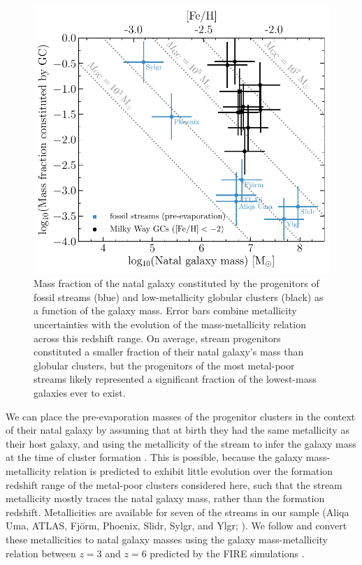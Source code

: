 \documentclass[twocolumn]{aastex63}
\begin{document}
\begin{figure}
\includegraphics[width=\hsize]{figures/mhost_fraction.pdf}
\caption{
\label{fig:mhost}
Mass fraction of the natal galaxy constituted by the progenitors of fossil streams (blue) and low-metallicity globular clusters (black) as a function of the galaxy mass.
Error bars combine metallicity uncertainties with the evolution of the mass-metallicity relation across this redshift range.
On average, stream progenitors constituted a smaller fraction of their natal galaxy's mass than globular clusters, but the progenitors of the most metal-poor streams likely represented a significant fraction of the lowest-mass galaxies ever to exist.
}
\end{figure}

We can place the pre-evaporation masses of the progenitor clusters in the context of their natal galaxy by assuming that at birth they had the same metallicity as their host galaxy, and using the metallicity of the stream to infer the galaxy mass at the time of cluster formation \citep{kruijssen20b}. This is possible, because the galaxy mass-metallicity relation is predicted to exhibit little evolution over the formation redshift range of the metal-poor clusters considered here, such that the stream metallicity mostly traces the natal galaxy mass, rather than the formation redshift. Metallicities are available for seven of the streams in our sample (Aliqa Uma, ATLAS, Fj\"orm, Phoenix, Slidr, Sylgr, and Ylgr; \citealt{ibata:2019,li:2020,wan20}). We follow \citet{kruijssen19c} and convert these metallicities to natal galaxy masses using the galaxy mass-metallicity relation between $z=3$ and $z=6$ predicted by the FIRE simulations \citep{ma16}.
\end{document}
